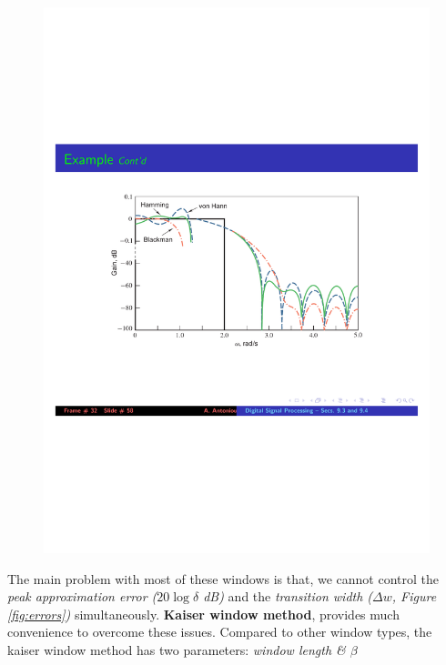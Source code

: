 \documentclass[11pt]{article}
\begin{document}
\begin{figure}[H]
\begin{minipage}{.5\textwidth}
	  \includegraphics[width=1\linewidth]{windows-res}
	  \label{fig:test2}
	\end{minipage}
\end{figure}




The main problem with most of these windows is that, we cannot control the 
{\it peak approximation error ($20\log{\delta}$ dB)} and the {\it transition width ($\Delta w$, Figure \ref{fig:errors})} simultaneously. 
{\bf Kaiser window method}, provides much convenience to overcome these issues. 
Compared to other window types, the kaiser window method has two parameters: {\it window length \& $\beta$}
\end{document}
